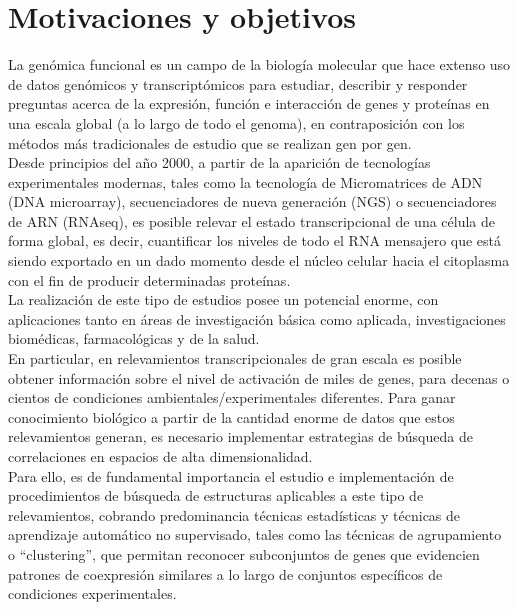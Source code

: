 \chapter*{Motivaciones y objetivos}
La genómica funcional es un campo de la biología molecular que hace extenso uso de datos genómicos y transcriptómicos para estudiar, describir y responder preguntas acerca de la expresión, función e interacción de genes y proteínas en una escala global (a lo largo de todo el genoma), en contraposición con los métodos más tradicionales de estudio que se realizan gen por gen.\\
Desde principios del año 2000, a partir de la aparición de tecnologías experimentales modernas, tales como la tecnología de Micromatrices de ADN (DNA microarray), secuenciadores de nueva generación (NGS) o secuenciadores de ARN (RNAseq), es posible relevar el estado transcripcional de una célula de forma global, es decir, cuantificar los niveles de todo el RNA mensajero que está siendo exportado en un dado momento desde el núcleo celular hacia el citoplasma con el fin de producir determinadas proteínas.\\
La realización de este tipo de estudios posee un potencial enorme, con aplicaciones tanto en áreas de investigación básica como aplicada, investigaciones biomédicas, farmacológicas y de la salud.\\
En particular, en relevamientos transcripcionales de gran escala es posible obtener información sobre el nivel de activación de miles de genes, para decenas o cientos de condiciones ambientales/experimentales diferentes. Para ganar conocimiento biológico a partir de la cantidad enorme de datos que estos relevamientos generan, es necesario implementar estrategias de búsqueda de correlaciones en espacios de alta dimensionalidad.\\
Para ello, es de fundamental importancia el estudio e implementación de procedimientos de búsqueda de estructuras aplicables a este tipo de relevamientos, cobrando predominancia técnicas estadísticas y técnicas de aprendizaje automático no supervisado, tales como las técnicas de agrupamiento o ``clustering'', que permitan reconocer subconjuntos de genes que evidencien patrones de coexpresión similares a lo largo de conjuntos específicos de condiciones experimentales.\cite{functional_genomics_definition_nature}


